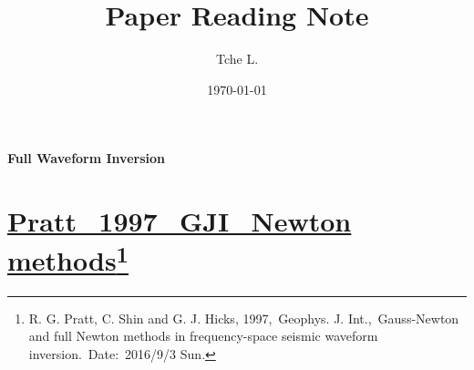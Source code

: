\documentclass{article}
\title{\Huge\bf Paper Reading Note}
\author{Tche L.}
\date{\today}
\renewcommand{\part}[1]{{\LARGE\bf\noindent #1}}
\newcommand{\Ppath}{/home/tche/Learning/Learning/Paper/}
\newcommand{\prf}{This is relative path from \Papth to the paper file}
\newcommand{\pmk}{This is the brief info.}
\newcommand{\pti}{This is the paper tile}
\newcommand{\pay}{These are authors and year}
\newcommand{\pjo}{This is the journal}
\newcommand{\pda}{This is the date}
\newcommand{\refp}[1]{\href{run:\Ppath\prf}{#1}}
\newcommand{\pinfo}{\refp{\pmk}\footnote{\pay,~\pjo,~\pti.~Date:~\pda}}
\begin{document}
\maketitle
\renewcommand{\pmk}{Contents}
\tableofcontents
\newpage


\part{Full Waveform Inversion}

\renewcommand{\pmk}{Pratt\_1997\_GJI\_Newton methods}
\renewcommand{\prf}{FWI/\pmk.pdf}
\renewcommand{\pti}{Gauss-Newton and full Newton methods in frequency-space seismic waveform inversion}
\renewcommand{\pay}{R. G. Pratt, C. Shin and G. J. Hicks, 1997}
\renewcommand{\pjo}{Geophys. J. Int.}
\renewcommand{\pda}{2016/9/3 Sun.}
\section{\pinfo}
\end{document}
